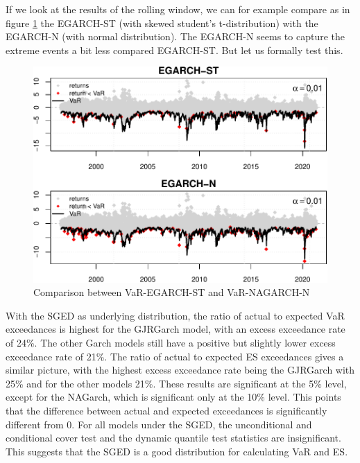 \documentclass[a4paper, twoside]{templates/ociamthesis}
\begin{document}
\noindent If we look at the results of the rolling window, we can for example compare as in figure \ref{fig:figurebacktests2} the EGARCH-ST (with skewed student's t-distribution) with the EGARCH-N (with normal distribution). The EGARCH-N seems to capture the extreme events a bit less compared EGARCH-ST. But let us formally test this.~\\

\newpage

\begin{figure}[h]

{\centering \includegraphics[width=0.9\linewidth]{_main_files/figure-latex/figurebacktests2-1} 

}

\caption{Comparison between VaR-EGARCH-ST and VaR-NAGARCH-N}\label{fig:figurebacktests2}
\end{figure}

With the SGED as underlying distribution, the ratio of actual to expected VaR exceedances is highest for the GJRGarch model, with an excess exceedance rate of 24\%. The other Garch models still have a positive but slightly lower excess exceedance rate of 21\%. The ratio of actual to expected ES exceedances gives a similar picture, with the highest excess exceedance rate being the GJRGarch with 25\% and for the other models 21\%. These results are significant at the 5\% level, except for the NAGarch, which is significant only at the 10\% level. This points that the difference between actual and expected exceedances is significantly different from 0. For all models under the SGED, the unconditional and conditional cover test and the dynamic quantile test statistics are insignificant. This suggests that the SGED is a good distribution for calculating VaR and ES.
\end{document}
